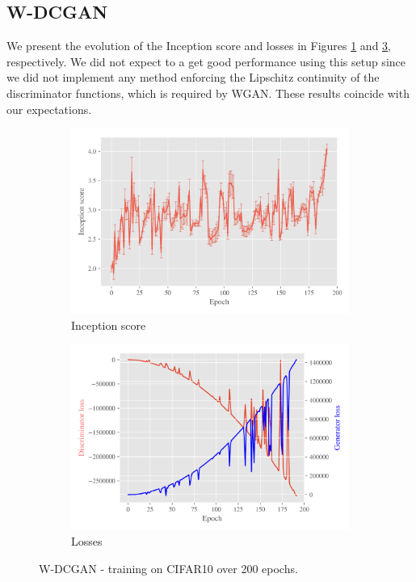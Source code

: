 \subsection{W-DCGAN}
\label{sec:exp-w-dcgan}
We present the evolution of the Inception score and losses in Figures \ref{fig:exp-w-dcgan-is} and \ref{fig:exp-w-dcgan-losses}, respectively. We did not expect to a get good performance using this setup since we did not implement any method enforcing the Lipschitz continuity of the discriminator functions, which is required by WGAN. These results coincide with our expectations.
   
\begin{figure}[H]
    \centering
    \begin{subfigure}[t]{0.49\textwidth}
        \centering
		\includegraphics[width=\textwidth]{../code/results/figures/w-dcgan_cifar10_is.png}
		\caption{Inception score}
		\label{fig:exp-w-dcgan-is}
    \end{subfigure}
    \begin{subfigure}[t]{0.49\textwidth}
        \centering
        \includegraphics[width=\textwidth]{../code/results/figures/w-dcgan_cifar10_losses.png}
		\caption{Losses}
		\label{fig:exp-w-dcgan-losses}
    \end{subfigure}
    \caption{W-DCGAN - training on CIFAR10 over 200 epochs.}
\end{figure}

